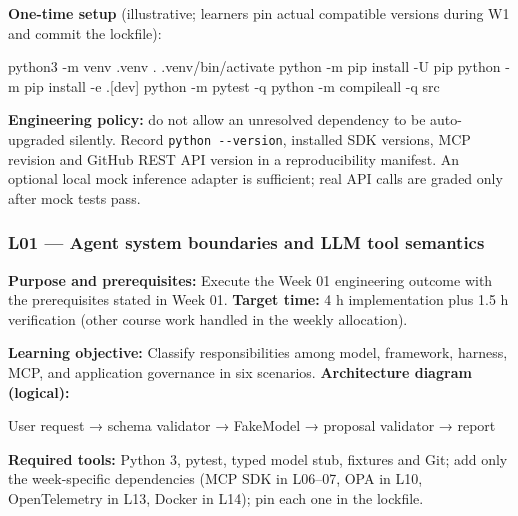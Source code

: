 \documentclass[
  10pt,
]{article}
\newenvironment{Shaded}{\begin{snugshade}}{\end{snugshade}}
\newcommand{\AttributeTok}[1]{\textcolor[rgb]{0.13,0.29,0.53}{#1}}
\newcommand{\BuiltInTok}[1]{#1}
\newcommand{\ExtensionTok}[1]{#1}
\newcommand{\NormalTok}[1]{#1}
\newcommand{\StringTok}[1]{\textcolor[rgb]{0.31,0.60,0.02}{#1}}
\begin{document}
\textbf{One-time setup} (illustrative; learners pin actual compatible
versions during W1 and commit the lockfile):

\begin{Shaded}
\begin{Highlighting}[]
\ExtensionTok{python3} \AttributeTok{{-}m}\NormalTok{ venv .venv}
\BuiltInTok{.}\NormalTok{ .venv/bin/activate}
\ExtensionTok{python} \AttributeTok{{-}m}\NormalTok{ pip install }\AttributeTok{{-}U}\NormalTok{ pip}
\ExtensionTok{python} \AttributeTok{{-}m}\NormalTok{ pip install }\AttributeTok{{-}e} \StringTok{\textquotesingle{}.[dev]\textquotesingle{}}
\ExtensionTok{python} \AttributeTok{{-}m}\NormalTok{ pytest }\AttributeTok{{-}q}
\ExtensionTok{python} \AttributeTok{{-}m}\NormalTok{ compileall }\AttributeTok{{-}q}\NormalTok{ src}
\end{Highlighting}
\end{Shaded}

\textbf{Engineering policy:} do not allow an unresolved dependency to be
auto-upgraded silently. Record \texttt{python\ -\/-version}, installed
SDK versions, MCP revision and GitHub REST API version in a
reproducibility manifest. An optional local mock inference adapter is
sufficient; real API calls are graded only after mock tests pass.

\subsubsection{L01 --- Agent system boundaries and LLM tool
semantics}\label{l01-agent-system-boundaries-and-llm-tool-semantics}

\textbf{Purpose and prerequisites:} Execute the Week 01 engineering
outcome with the prerequisites stated in Week 01. \textbf{Target time:}
4 h implementation plus 1.5 h verification (other course work handled in
the weekly allocation).

\textbf{Learning objective:} Classify responsibilities among model,
framework, harness, MCP, and application governance in six scenarios.
\textbf{Architecture diagram (logical):}

\begin{Shaded}
\begin{Highlighting}[]
\NormalTok{User request → schema validator → FakeModel → proposal}
\NormalTok{validator → report}
\end{Highlighting}
\end{Shaded}

\textbf{Required tools:} Python 3, pytest, typed model stub, fixtures
and Git; add only the week-specific dependencies (MCP SDK in L06--07,
OPA in L10, OpenTelemetry in L13, Docker in L14); pin each one in the
lockfile.
\end{document}
